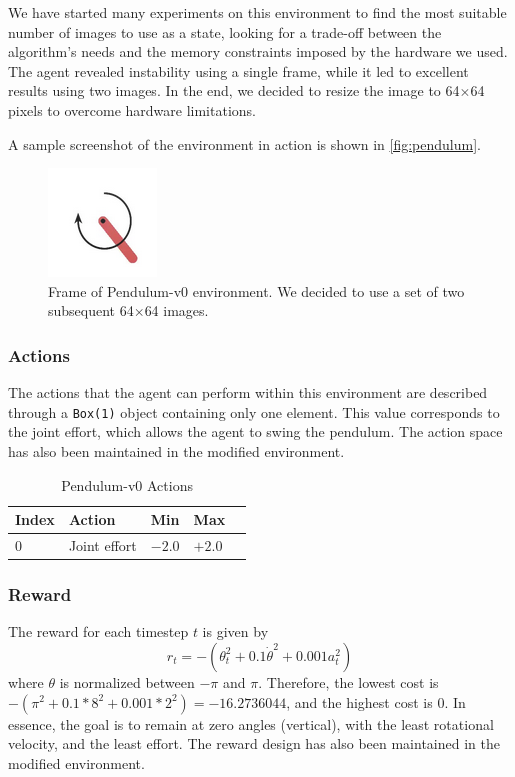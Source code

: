 We have started many experiments on this environment to find the most suitable number of images to use as a state, looking for a trade-off between the algorithm’s needs and the memory constraints imposed by the hardware we used.
The agent revealed instability using a single frame, while it led to excellent results using two images.
In the end, we decided to resize the image to 64$\times$64 pixels to overcome hardware limitations.

A sample screenshot of the environment in action is shown in \vref{fig:pendulum}.

\begin{figure}[ht!]
    \centering
    \includegraphics[height=0.2\paperwidth]{img/pendulum.png}
    \caption[Frame of Pendulum-v0 environment]{Frame of Pendulum-v0 environment.
        We decided to use a set of two subsequent 64$\times$64 images.}
    \label{fig:pendulum}
\end{figure}

\subsubsection{Actions}

The actions that the agent can perform within this environment are described through a \texttt{Box(1)} object containing only one element.
This value corresponds to the joint effort, which allows the agent to swing the pendulum.
The action space has also been maintained in the modified environment.

\begin{table}[!h]
    \centering
    \caption{Pendulum-v0 Actions }
    \label{mountain_action}
    \begin{tabular}{@{}lllll@{}}
        \toprule
        Index & Action       & Min    & Max    \\ \midrule
        0     & Joint effort & $-2.0$ & $+2.0$ \\
        \bottomrule
    \end{tabular}
\end{table}

\subsubsection{Reward}
The reward for each timestep $t$ is given by \[r_t = -(\theta_t^2 + 0.1 \dot{\theta}^2 + 0.001 a_t^2)\]
where $\theta$ is normalized between $-\pi$ and $\pi$.
Therefore, the lowest cost is $-(\pi^2 + 0.1*8^2 + 0.001*2^2) = -16.2736044$, and the highest cost is $0$.
In essence, the goal is to remain at zero angles (vertical), with the least rotational velocity, and the least effort.
The reward design has also been maintained in the modified environment.

